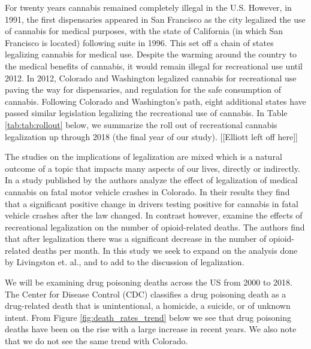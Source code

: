 \documentclass{article}
\begin{document}
For twenty years cannabis remained completely illegal in the U.S. However, in 1991, the first dispensaries appeared in San Francisco as the city legalized the use of cannabis for medical purposes, with the state of California (in which San Francisco is located) following suite in 1996. This set off a chain of states legalizing cannabis for medical use. Despite the warming around the country to the medical benefits of cannabis, it would remain illegal for recreational use until 2012. In 2012, Colorado and Washington legalized cannabis for recreational use paving the way for dispensaries, and regulation for the safe consumption of cannabis. Following Colorado and Washington's path, eight additional states have passed similar legislation legalizing the recreational use of cannabis. In Table \ref{tab:tab:rollout} below, we summarize the roll out of recreational cannabis legalization up through 2018 (the final year of our study). [[Elliott left off here]]



The studies on the implications of legalization are mixed which is a natural outcome of a topic that impacts many aspects of our lives, directly or indirectly. In a study published by \citet{Salomonsen-SautelStacy2014Tifm} the authors analyze the effect of legalization of medical cannabis on fatal motor vehicle crashes in Colorado. In their results they find that a significant positive change in drivers testing positive for cannabis in fatal vehicle crashes after the law changed. In contrast however, \citet{LivingstonMelvinD2017RCLa} examine the effects of recreational legalization on the number of opioid-related deaths. The authors find that after legalization there was a significant decrease in the number of opioid-related deaths per month. In this study we seek to expand on the analysis done by Livingston et. al., and to add to the discussion of legalization.

We will be examining drug poisoning deaths across the US from 2000 to 2018. The Center for Disease Control (CDC) classifies a drug poisoning death as a drug-related death that is unintentional, a homicide, a suicide, or of unknown intent. From Figure \ref{fig:death_rates_trend} below we see that drug poisoning deaths have been on the rise with a large increase in recent years. We also note that we do not see the same trend with Colorado.
\end{document}
